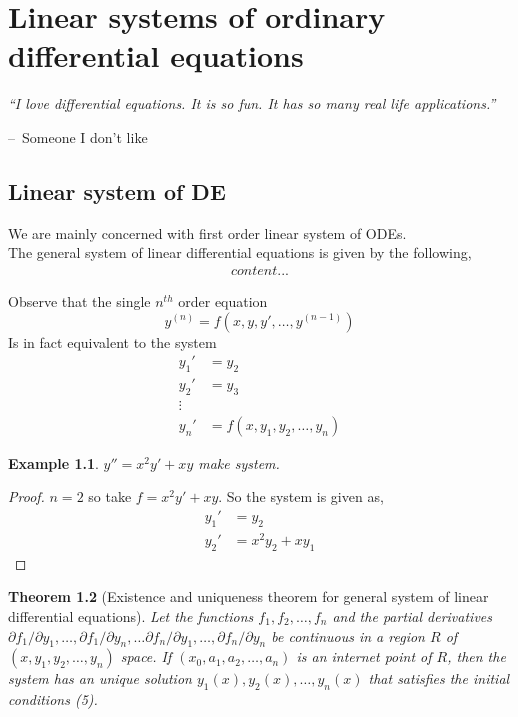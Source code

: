 \documentclass[oneside,11pt,pdftex,final]{book}%
\makeatletter
\numberwithin{equation}{section}
\newenvironment{chapquote}[2][2em]
{\setlength{\@tempdima}{#1}%
	\def\chapquote@author{#2}%
	\parshape 1 \@tempdima \dimexpr\textwidth-2\@tempdima\relax%
	\itshape}
{\par\normalfont\hfill--\ \chapquote@author\hspace*{\@tempdima}\par\bigskip}
\newtheorem{theorem}{Theorem}[chapter]%
\newtheorem{example}[theorem]{Example}
\numberwithin{section}{chapter}
\numberwithin{equation}{chapter}
\makeatother
\begin{document}
\chapter{Linear systems of ordinary differential equations}
\begin{chapquote}{Someone I don't like}
	``I love differential equations. It is so fun. It has so many real life applications.''
\end{chapquote}

\section{Linear system of DE}
We are mainly concerned with first order linear system of ODEs.\\

The general system of linear differential equations is given by the following,
\begin{align*}
	content...
\end{align*}

Observe that the single $ n^{th} $ order equation \begin{equation}\label{def:largeeq}
	y^{(n)}=f(x,y,y',\dots,y^{(n-1)}) 
\end{equation} 
Is in fact equivalent to the system 
\begin{align*}
	y_1'&=y_2\\
	y_2'&=y_3\\
	\vdots &\\
	y_n'&=f(x,y_1,y_2,\dots,y_n)
\end{align*}
\begin{example}
	$ y''=x^2y'+xy $ make system.
\end{example}
\begin{proof}
	$ n=2 $ so take $ f=x^2y'+xy $. So the system is given as,
	\begin{align*}
		y_1'&=y_2\\
		y_2'&=x^2y_2+xy_1
	\end{align*}
\end{proof}

\begin{theorem}[Existence and uniqueness theorem for general system of linear differential equations]
	Let the functions $ f_1, f_2, \dots, f_n $ and the partial derivatives $ \partial f_1/\partial y_1, \dots, \partial f_1/\partial y_n, \dots \partial f_n/ \partial y_1, \dots, \partial f_n/\partial y_n $ be continuous in a region $ R $ of $ (x,y_1,y_2,\dots,y_n) $ space. If $ (x_0,a_1,a_2,\dots,a_n) $ is an internet point of $ R $, then the system has an unique solution $ y_1(x), y_2(x), \dots, y_n(x)$ that satisfies the initial conditions (5).
\end{theorem}
\end{document}
